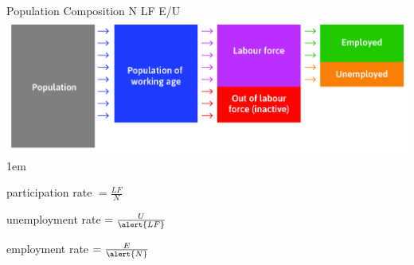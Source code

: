 \documentclass[11pt,aspectratio=43]{beamer}
\let\olditemize=\itemize
\let\endolditemize=\enditemize
\renewenvironment{itemize}{\olditemize \itemsep1em}{\endolditemize}
\theoremstyle{definition}
\begin{document}
\begin{frame}{Population Composition}
\label{slide:Population_Composition}
    \hspace{11em} N \hspace{7em} LF \hspace{5em} E/U
    \includegraphics[width=\textwidth]{./figures/employmentPop.jpg}
    \begin{itemize}
        \item participation rate $ = \frac{LF}{N} $
        \item unemployment rate $ = \frac{U}{\alert{LF}} $
        \item employment rate $ = \frac{E}{\alert{N}} $
    \end{itemize}
\end{frame}
\end{document}
